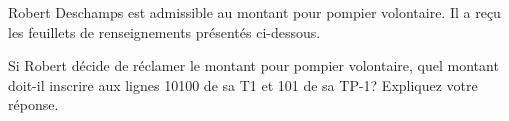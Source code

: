Robert Deschamps est admissible au montant pour pompier volontaire. Il a reçu les feuillets de renseignements présentés ci-dessous.

Si Robert décide de réclamer le montant pour pompier volontaire, quel montant doit-il inscrire aux lignes 10100 de sa T1 et 101 de sa
TP-1? Expliquez votre réponse.
